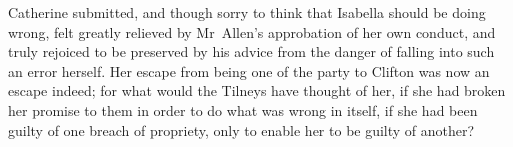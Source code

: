  Catherine submitted, and though sorry to think that Isabella should be doing wrong, felt greatly relieved by Mr~Allen's approbation of her own conduct, and truly rejoiced to be preserved by his advice from the danger of falling into such an error herself. Her escape from being one of the party to Clifton was now an escape indeed; for what would the Tilneys have thought of her, if she had broken her promise to them in order to do what was wrong in itself, if she had been guilty of one breach of propriety, only to enable her to be guilty of another? 